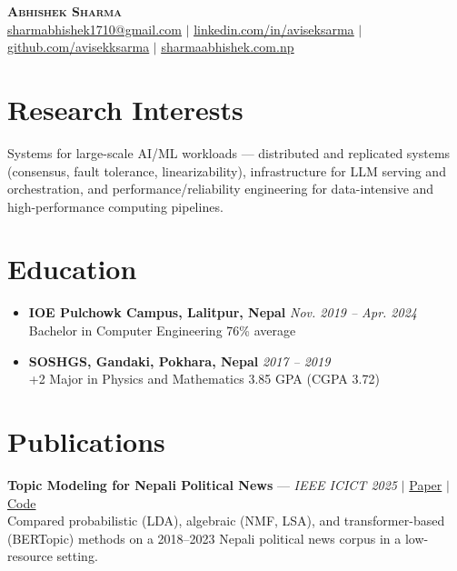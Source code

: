 \documentclass[letterpaper,11pt]{article}
\begin{document}
\begin{center}
    \textbf{\Huge \scshape Abhishek Sharma} \\ \vspace{6pt}
    \small \href{mailto:sharmabhishek1710@gmail.com}{\underline{sharmabhishek1710@gmail.com}} $|$ 
    \href{https://www.linkedin.com/in/aviseksarma/}{\underline{linkedin.com/in/aviseksarma}} $|$
    \href{https://github.com/avisekksarma}{\underline{github.com/avisekksarma}} $|$
    \href{https://sharmaabhishek.com.np/}{\underline{sharmaabhishek.com.np}}
\end{center}

\section{Research Interests}
 \begin{itemize}[leftmargin=0.15in, label={}]
    \small{\item{
    Systems for large-scale AI/ML workloads --- distributed and replicated systems (consensus, fault tolerance, linearizability), infrastructure for LLM serving and orchestration, and performance/reliability engineering for data-intensive and high-performance computing pipelines.
    }}
 \end{itemize}

\section{Education}
\begin{itemize}
    \item \textbf{IOE Pulchowk Campus, Lalitpur, Nepal} \hfill \textit{Nov. 2019 -- Apr. 2024} \\
    Bachelor in Computer Engineering \hfill 76\% average
    \item \textbf{SOSHGS, Gandaki, Pokhara, Nepal} \hfill \textit{2017 -- 2019} \\
    +2 Major in Physics and Mathematics \hfill 3.85 GPA (CGPA 3.72)
\end{itemize}

\section{Publications}
 \begin{itemize}[leftmargin=0.15in, label={}]
    \small{\item{
     \textbf{Topic Modeling for Nepali Political News} --- \textit{IEEE ICICT 2025} $|$ \href{https://doi.org/10.1109/ICICT64420.2025.11004776}{Paper} $|$ \href{https://github.com/adh-aashish/topic_modeling}{Code} \\
     Compared probabilistic (LDA), algebraic (NMF, LSA), and transformer-based (BERTopic) methods on a 2018--2023 Nepali political news corpus in a low-resource setting.
    }}
 \end{itemize}
\end{document}
